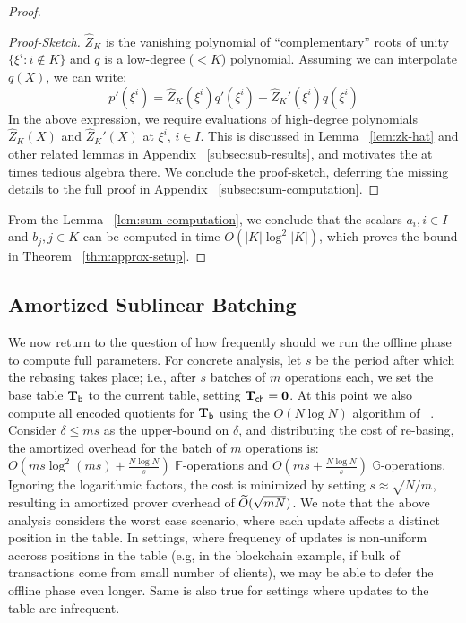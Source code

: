 \begin{proof}
\begin{proof}[Proof-Sketch]
        $\widehat{Z}_K$ is the vanishing polynomial of ``complementary'' roots of unity $\{\xi^i: i\not\in K\}$
        and $q$ is a low-degree ($<K$) polynomial. Assuming we can interpolate $q(X)$, we can write:
        \[ p'(\xi^i) = \widehat{Z}_K(\xi^i)q'(\xi^i) + \widehat{Z}_K'(\xi^i)q(\xi^i) \]
        In the above expression, we require evaluations of high-degree polynomials $\widehat{Z}_K(X)$ and $\widehat{Z}_K'(X)$
        at $\xi^i$, $i\in I$. This is discussed in Lemma ~\ref{lem:zk-hat} and other related lemmas in Appendix ~\ref{subsec:sub-results},
        and motivates the at times tedious algebra there. We conclude the proof-sketch, deferring the missing details to the full
        proof in Appendix ~\ref{subsec:sum-computation}.
    \end{proof}

    From the Lemma ~\ref{lem:sum-computation}, we conclude that the scalars $a_i,i\in I$ and $b_j, j\in K$ can be computed in
    time $O(|K|\log^2 |K|)$, which proves the bound in Theorem ~\ref{thm:approx-setup}.

\end{proof}

\subsection{Amortized Sublinear Batching}\label{sec:amortization}
We now return to the question of how frequently should we run the offline phase to compute full parameters.
For concrete analysis, let $s$ be the period after which the rebasing takes place; i.e., after $s$ batches of $m$ operations
each, we set the base table $\mathbf{T}_{\mathsf{b}}$ to the current table, setting $\mathbf{T}_{\mathsf{ch}}=\mathbf{0}$. At this point we also compute all
encoded quotients for $\mathbf{T}_{\mathsf{b}}$ using the $O(N\log N)$ algorithm of ~\cite{EPRINT:FeiKho23}. Consider $\delta\leq ms$ as
the upper-bound on $\delta$, and distributing the cost of re-basing, the amortized overhead for the batch of $m$ operations is:
$O(ms \log^2(ms)+\frac{N\log N}{s})$ $\mathbb{F}$-operations and $O(ms +\frac{N\log N}{s})$ $\mathbb{G}$-operations. Ignoring
the logarithmic factors, the cost is minimized by setting $s\approx \sqrt{N/m}$, resulting in amortized prover overhead of
$\widetilde{O}(\sqrt{mN})$. We note that the above analysis considers the worst case scenario, where each update affects a distinct
position in the table. In settings, where frequency of updates is non-uniform accross positions in the table (e.g, in the
blockchain example, if bulk of transactions come from small number of clients), we may be able to defer the offline phase even longer.
Same is also true for settings where updates to the table are infrequent.